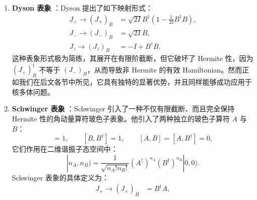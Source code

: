 \begin{enumerate}
这正是所有玻色子表象方法的核心思想。在此我们已经清楚地看到，要使这一概念成立，必须满足两项基本要素：
\begin{enumerate}
\item 必须确保计算中的代数规则——即底层的算符代数——在映射过程中严格守恒。
\item 只允许在物理子空间内开展计算，即在我们的例子中，所有态矢量都必须属于算符 $J^{2}$ 对应于本征值 $I(I+1)$ 的本征子空间。一般而言，这一事实可以表述为：人们只能使用那些属于底层对称性群的
Casimir 算符的本征态的矢量 \cite{Ya74}。
\end{enumerate}
作为具体示例，我们可以将角动量本征态用玻色子态显式表示为：
\begin{equation}
|IM\rangle\to|IM)=\left[(I+M)!\right]^{-1/2}(B^{\dagger})^{I+M}|0).\label{eq:9.8}
\end{equation}
在实际应用中，我们必须对式 \ref{eq:9.4} 采用 Taylor 展开。当玻色子数目相对于 $2I$ 而言很小时，展开收敛极快。此类玻色子表象的一个不可避免的缺点在于：原则上需要无穷多阶展开项才能严格满足对易代数
\ref{eq:9.2}。然而，还存在着其他途径来避开这一困难：
\item \textbf{Dyson 表象} \cite{Dy56}：Dyson 提出了如下映射形式：
\begin{align}
J_{+}\to(J_{+})_{B} & =\sqrt{2I}B^{\dagger}\left(1-\frac{1}{2I}B^{\dagger}B\right),\nonumber \\
J_{-}\to(J_{-})_{B} & =\sqrt{2I}B,\label{eq:9.9}\\
J_{z}\to(J_{z})_{B} & =-I+B^{\dagger}B.\nonumber 
\end{align}
这种表象形式极为简练，其展开在有限阶截断，但它破坏了 Hermite 性，因为 $(J_{+})^{\dagger}_{B}$ 不等于
$(J_{-})_{B}$，从而导致非 Hermite 的有效 Hamiltonian。然而正如我们在后文各节中所见，它具有独特的显著优势，并且同样能够成功应用于核多体问题。
\item \textbf{Schwinger 表象} \cite{Sch65}：Schwinger 引入了一种不仅有限截断、而且完全保持 Hermite
性的角动量算符玻色子表象。他引入了两种独立的玻色子算符 $A$ 与 $B$：
\begin{equation}
[A,A^{\dagger}]=1,\qquad[B,B^{\dagger}]=1,\qquad[A,B]=[A,B^{\dagger}]=0,\label{eq:9.10}
\end{equation}
它们作用在二维谐振子态空间中：
\begin{equation}
|n_{A},n_{B})=\frac{1}{\sqrt{n_{A}!n_{B}!}}(A^{\dagger})^{n_{A}}(B^{\dagger})^{n_{B}}|0,0).\label{eq:9.11}
\end{equation}
Schwinger 表象的具体定义为：
\begin{align}
J_{+}\to(J_{+})_{B} & =B^{\dagger}A,\nonumber \\

\end{align}
\end{enumerate}
